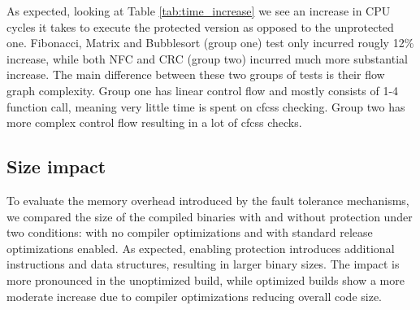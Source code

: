 As expected, looking at Table \ref{tab:time_increase} we see an increase in CPU cycles it takes to execute the protected version as opposed to the unprotected one. Fibonacci, Matrix and Bubblesort (group one) test only incurred rougly 12\% increase, while both NFC and CRC (group two) incurred much more substantial increase. The main difference between these two groups of tests is their flow graph complexity. Group one has linear control flow and mostly consists of 1-4 function call, meaning very little time is spent on \acrshort{cfcss} checking. Group two has more complex control flow resulting in a lot of \acrshort{cfcss} checks.




\subsection{Size impact}

To evaluate the memory overhead introduced by the fault tolerance mechanisms, we compared the size of the compiled binaries with and without protection under two conditions: with no compiler optimizations and with standard release optimizations enabled. As expected, enabling protection introduces additional instructions and data structures, resulting in larger binary sizes. The impact is more pronounced in the unoptimized build, while optimized builds show a more moderate increase due to compiler optimizations reducing overall code size.

